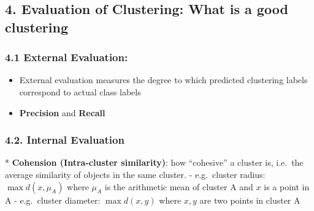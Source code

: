 \documentclass[11pt]{article}
\providecommand{\tightlist}{%
      \setlength{\itemsep}{0pt}\setlength{\parskip}{0pt}}
\begin{document}
    \hypertarget{evaluation-of-clustering-what-is-a-good-clustering}{%
\subsection{4. Evaluation of Clustering: What is a good
clustering}\label{evaluation-of-clustering-what-is-a-good-clustering}}

\hypertarget{external-evaluation}{%
\subsubsection{4.1 External Evaluation:}\label{external-evaluation}}

\begin{itemize}
\tightlist
\item
  External evaluation measures the degree to which predicted clustering
  labels correspond to actual class labels\\
\item
  \textbf{Precision} and \textbf{Recall}
\end{itemize}

    \hypertarget{internal-evaluation}{%
\subsubsection{4.2. Internal Evaluation}\label{internal-evaluation}}

 * \textbf{Cohension (Intra-cluster similarity)}: how ``cohesive'' a
cluster is, i.e.~the average similarity of objects in the same cluster.
- e.g.~cluster radius: \(\max{d(x, μ_A)}\) where \(μ_A\) is the
arithmetic mean of cluster A and \(x\) is a point in A - e.g.~cluster
diameter: \(\max{d(x, y)}\) where \(x,y\) are two points in cluster A
\end{document}
